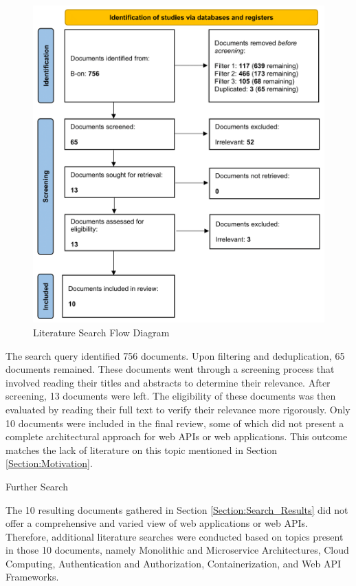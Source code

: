 \documentclass[12pt, reqno]{amsbook}
\makeatletter
\def\subsection{\@startsection{subsection}{2}%
      \z@{.5\linespacing\@plus.7\linespacing}{.25\linespacing}%
      {\normalfont\bfseries\flushleft}}
\theoremstyle{definition}
\theoremstyle{definition}
\numberwithin{section}{chapter}
\numberwithin{table}{chapter}
\numberwithin{figure}{chapter}
\makeatother
\begin{document}
\begin{figure}[H]
  \centering
  \includegraphics[width=0.9\linewidth]{images/Literature_Search_Flow_Diagram.png}
  \caption{\label{Figure:Literature_Search_Flow_Diagram}Literature Search Flow Diagram}
\end{figure}

The search query identified 756 documents. Upon filtering and deduplication, 65 documents remained. These documents went through a screening process that involved reading their titles and abstracts to determine their relevance. After screening, 13 documents were left. The eligibility of these documents was then evaluated by reading their full text to verify their relevance more rigorously. Only 10 documents were included in the final review, some of which did not present a complete architectural approach for web \acp{API} or web applications. This outcome matches the lack of literature on this topic mentioned in Section \ref{Section:Motivation}.

\subsection{Further Search}
\label{Subsection:Further_Search}

The 10 resulting documents gathered in Section \ref{Section:Search_Results} did not offer a comprehensive and varied view of web applications or web \acp{API}. Therefore, additional literature searches were conducted based on topics present in those 10 documents, namely Monolithic and Microservice Architectures, Cloud Computing, Authentication and Authorization, Containerization, and Web \ac{API} Frameworks.
\end{document}
